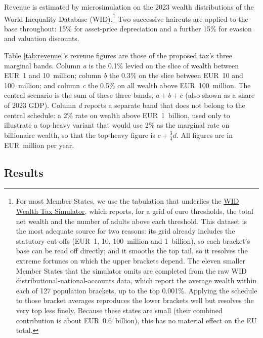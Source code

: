 \documentclass[../../main]{subfiles}
\begin{document}
Revenue is estimated by microsimulation on the 2023 wealth distributions of the World Inequality Database (WID).\footnote{For most Member States, we use the tabulation that underlies the \href{https://wid.world/world-wealth-tax-simulator/}{WID Wealth Tax Simulator}, which reports, for a grid of euro thresholds, the total net wealth and the number of adults above each threshold. This dataset is the most adequate source for two reasons: its grid already includes the statutory cut-offs (EUR~1, 10, 100~million and 1~billion), so each bracket's base can be read off directly; and it smooths the top tail, so it resolves the extreme fortunes on which the upper brackets depend.
The eleven smaller Member States that the simulator omits are completed from the raw WID distributional-national-accounts data, which report the average wealth within each of 127 population brackets, up to the top 0.001\%. Applying the schedule to those bracket averages reproduces the lower brackets well but resolves the very top less finely. Because these states are small (their combined contribution is about EUR~0.6~billion), this has no material effect on the EU total.}
Two successive haircuts are applied to the base throughout: 15\% for asset-price depreciation and a further 15\% for evasion and valuation discounts. %

Table \ref{tab:revenue}'s revenue figures are those of the proposed tax's three marginal bands. Column \textit{a} is the 0.1\% levied on the slice of wealth between EUR~1 and 10~million; column \textit{b} the 0.3\% on the slice between EUR~10 and 100~million; and column \textit{c} the 0.5\% on all wealth above EUR~100~million. %
The central scenario is the sum of these three bands, $a+b+c$ (also shown as a share of 2023 GDP). Column \textit{d} reports a separate band that does not belong to the central schedule: a 2\% rate on wealth above EUR~1~billion, used only to illustrate a top-heavy variant that would use 2\% as the marginal rate on billionaire wealth, so that the top-heavy figure is $c+\frac{3}{4}d$. All figures are in EUR~million per year.

\subsection{Results}
\end{document}
